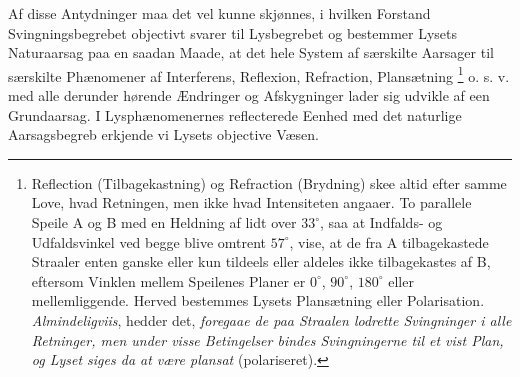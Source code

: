 \documentclass[12pt,a4paper]{book}
\begin{document}
Af disse Antydninger maa det vel kunne skjønnes, i hvilken Forstand
Svingningsbegrebet objectivt svarer til
Lysbegrebet og bestemmer Lysets Naturaarsag paa en saadan Maade, at det
hele System af særskilte Aarsager til særskilte Phænomener af
Interferens, Reflexion, Refraction, Plansætning%
\footnote{%
Reflection (Tilbagekastning) og Refraction (Brydning) skee altid efter
samme Love, hvad Retningen, men ikke hvad Intensiteten angaaer. To
parallele Speile A og B med en Heldning af lidt over $33^{\circ}$, saa
at Indfalds- og Udfaldsvinkel ved begge blive omtrent $57^{\circ}$,
vise, at de fra A tilbagekastede Straaler enten ganske eller kun
tildeels eller aldeles ikke tilbagekastes af B, eftersom Vinklen mellem
Speilenes Planer er $0^{\circ}$, $90^{\circ}$, $180^{\circ}$ eller
mellemliggende. Herved bestemmes Lysets Plansætning eller Polarisation.
\emph{Almindeligviis}, hedder det, \emph{foregaae de paa Straalen
lodrette Svingninger i alle Retninger, men under visse Betingelser
bindes Svingningerne til et vist Plan, og Lyset siges da at være
plansat} (polariseret).}
o. s. v. med alle derunder hørende Ændringer og Afskygninger lader sig
udvikle af een Grundaarsag. I Lysphænomenernes reflecterede Eenhed med
det naturlige Aarsagsbegreb erkjende vi Lysets objective Væsen.
\end{document}
